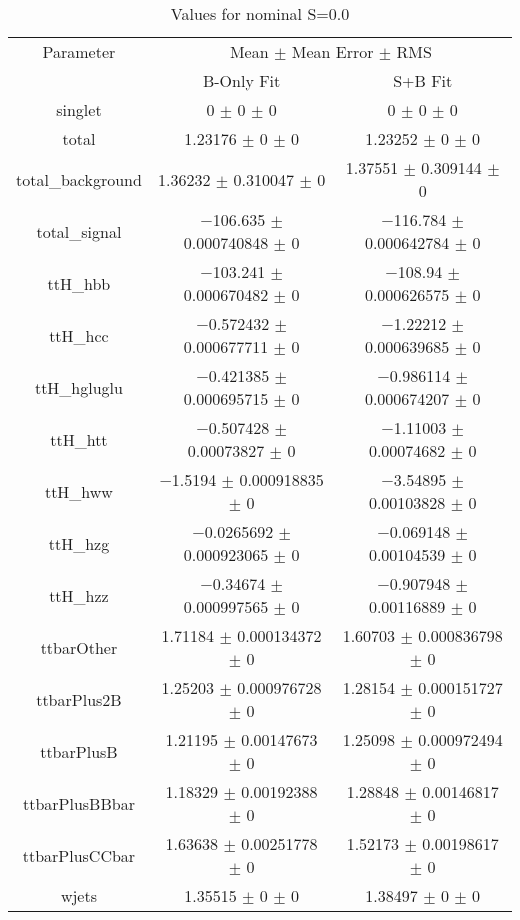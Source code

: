 \begin{table}
\centering
\caption{Values for nominal S=0.0}
\begin{tabular}{ccc}
\toprule
Parameter & \multicolumn{2}{c}{Mean $\pm$ Mean Error $\pm$ RMS}\\
 & B-Only Fit & S+B Fit\\
\midrule
singlet & \num{0} $\pm$ \num{0} $\pm$ \num{0} & \num{0} $\pm$ \num{0} $\pm$ \num{0}\\
total & \num{1.23176} $\pm$ \num{0} $\pm$ \num{0} & \num{1.23252} $\pm$ \num{0} $\pm$ \num{0}\\
total\_background & \num{1.36232} $\pm$ \num{0.310047} $\pm$ \num{0} & \num{1.37551} $\pm$ \num{0.309144} $\pm$ \num{0}\\
total\_signal & \num{-106.635} $\pm$ \num{0.000740848} $\pm$ \num{0} & \num{-116.784} $\pm$ \num{0.000642784} $\pm$ \num{0}\\
ttH\_hbb & \num{-103.241} $\pm$ \num{0.000670482} $\pm$ \num{0} & \num{-108.94} $\pm$ \num{0.000626575} $\pm$ \num{0}\\
ttH\_hcc & \num{-0.572432} $\pm$ \num{0.000677711} $\pm$ \num{0} & \num{-1.22212} $\pm$ \num{0.000639685} $\pm$ \num{0}\\
ttH\_hgluglu & \num{-0.421385} $\pm$ \num{0.000695715} $\pm$ \num{0} & \num{-0.986114} $\pm$ \num{0.000674207} $\pm$ \num{0}\\
ttH\_htt & \num{-0.507428} $\pm$ \num{0.00073827} $\pm$ \num{0} & \num{-1.11003} $\pm$ \num{0.00074682} $\pm$ \num{0}\\
ttH\_hww & \num{-1.5194} $\pm$ \num{0.000918835} $\pm$ \num{0} & \num{-3.54895} $\pm$ \num{0.00103828} $\pm$ \num{0}\\
ttH\_hzg & \num{-0.0265692} $\pm$ \num{0.000923065} $\pm$ \num{0} & \num{-0.069148} $\pm$ \num{0.00104539} $\pm$ \num{0}\\
ttH\_hzz & \num{-0.34674} $\pm$ \num{0.000997565} $\pm$ \num{0} & \num{-0.907948} $\pm$ \num{0.00116889} $\pm$ \num{0}\\
ttbarOther & \num{1.71184} $\pm$ \num{0.000134372} $\pm$ \num{0} & \num{1.60703} $\pm$ \num{0.000836798} $\pm$ \num{0}\\
ttbarPlus2B & \num{1.25203} $\pm$ \num{0.000976728} $\pm$ \num{0} & \num{1.28154} $\pm$ \num{0.000151727} $\pm$ \num{0}\\
ttbarPlusB & \num{1.21195} $\pm$ \num{0.00147673} $\pm$ \num{0} & \num{1.25098} $\pm$ \num{0.000972494} $\pm$ \num{0}\\
ttbarPlusBBbar & \num{1.18329} $\pm$ \num{0.00192388} $\pm$ \num{0} & \num{1.28848} $\pm$ \num{0.00146817} $\pm$ \num{0}\\
ttbarPlusCCbar & \num{1.63638} $\pm$ \num{0.00251778} $\pm$ \num{0} & \num{1.52173} $\pm$ \num{0.00198617} $\pm$ \num{0}\\
wjets & \num{1.35515} $\pm$ \num{0} $\pm$ \num{0} & \num{1.38497} $\pm$ \num{0} $\pm$ \num{0}\\
\bottomrule
\end{tabular}
\end{table}